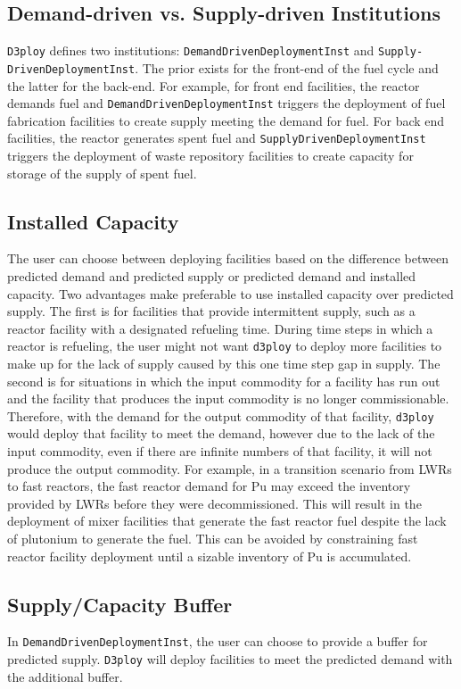 \documentclass[11pt,letterpaper]{article}
\newcommand{\deploy}{\texttt{d3ploy}\xspace}%
\newcommand{\Deploy}{\texttt{D3ploy}\xspace}%
\begin{document}
\subsection{\textbf{Demand-driven vs. Supply-driven Institutions}}
\Deploy defines two institutions: \texttt{DemandDrivenDeploymentInst} and \texttt{Supply-}
\noindent
\texttt{DrivenDeploymentInst}.
The prior exists for the front-end of the fuel cycle and the latter 
for the back-end. 
For example, for front end facilities, the reactor demands 
fuel and \texttt{DemandDrivenDeploymentInst} triggers the deployment 
of fuel fabrication facilities to create supply meeting the demand 
for fuel.
For back end facilities, the reactor generates spent fuel 
and \texttt{SupplyDrivenDeploymentInst} triggers the deployment of 
waste repository facilities to create capacity for storage of the supply 
of spent fuel. 

\subsection{\textbf{Installed Capacity}}
The user can choose between deploying facilities based on the difference 
between predicted demand and predicted supply or predicted demand and 
installed capacity.
Two advantages make preferable to use installed capacity over predicted 
supply. 
The first is for facilities that provide intermittent supply, such as a 
reactor facility with a designated refueling time. 
During time steps in which a reactor is refueling, the user might not 
want \deploy to deploy more facilities to make up for the lack of supply
caused by this one time step gap in supply. 
The second is for situations in which the input commodity for a facility has
run out and the facility that produces the input commodity 
is no longer commissionable. 
Therefore, with the demand for the output commodity of that facility, \deploy
would deploy that facility to meet the demand, however due to the lack of 
the input commodity, even if there are infinite numbers of that facility, 
it will not produce the output commodity. 
For example, in a transition scenario from LWRs to fast reactors, the fast 
reactor demand for Pu may exceed the inventory provided by LWRs before 
they were decommissioned. 
This will result in the deployment of mixer facilities that generate the 
fast reactor fuel despite the lack of plutonium to generate the fuel. 
This can be avoided by constraining fast reactor facility deployment 
until a sizable inventory of Pu is accumulated. 

\subsection{\textbf{Supply/Capacity Buffer}}
In \texttt{DemandDrivenDeploymentInst}, the user can choose to provide a
buffer for predicted supply.
\Deploy will deploy facilities to meet the predicted demand with the 
additional buffer. 
\end{document}
